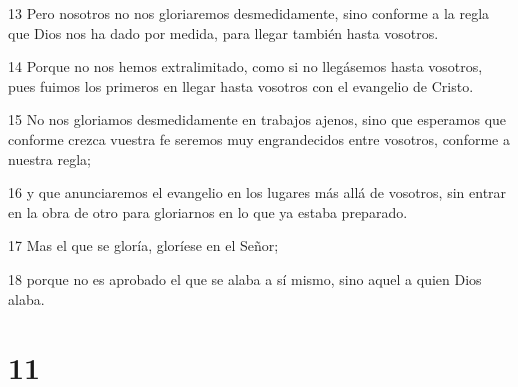 \par 13 Pero nosotros no nos gloriaremos desmedidamente, sino conforme a la regla que Dios nos ha dado por medida, para llegar también hasta vosotros.
\par 14 Porque no nos hemos extralimitado, como si no llegásemos hasta vosotros, pues fuimos los primeros en llegar hasta vosotros con el evangelio de Cristo.
\par 15 No nos gloriamos desmedidamente en trabajos ajenos, sino que esperamos que conforme crezca vuestra fe seremos muy engrandecidos entre vosotros, conforme a nuestra regla;
\par 16 y que anunciaremos el evangelio en los lugares más allá de vosotros, sin entrar en la obra de otro para gloriarnos en lo que ya estaba preparado.
\par 17 Mas el que se gloría, gloríese en el Señor;
\par 18 porque no es aprobado el que se alaba a sí mismo, sino aquel a quien Dios alaba.

\chapter{11}

